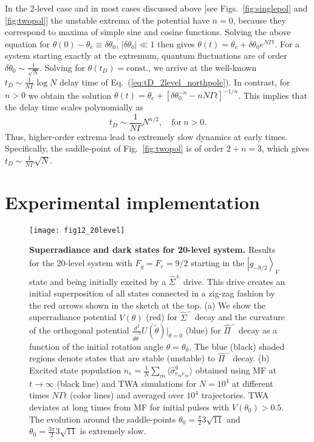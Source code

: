 \documentclass[aps,prx,superscriptaddress,twocolumn,notitlepage,nofootinbib,longbibliography]{revtex4-2}
\newcommand{\ket}[1]{\left|#1\right>}
\newcommand{\qusub}{q}
\begin{document}
In the 2-level case and in most cases discussed above [see Figs.~\ref{fig:singlepol} and \ref{fig:twopol}] the unstable extrema of the potential have $n=0$, because they correspond to maxima of simple sine and cosine functions.
Solving the above equation for $\theta(0)-\theta_e\equiv \delta\theta_0$, $|\delta\theta_0|\ll1$ then gives $\theta(t) =\theta_e+ \delta\theta_0 e^{N\Gamma t}$.
For a system starting exactly at the extremum, quantum fluctuations are of order $\delta\theta_0\sim \frac{1}{\sqrt{N}}$.
Solving for $\theta(t_D)=\text{const.}$, we arrive at the well-known $t_D\sim \frac{1}{N\Gamma} \log N$ delay time of Eq.~(\ref{eq:tD_2level_northpole}).  In contrast, for $n>0$ we obtain the solution $\theta(t) =\theta_e+ \left[ \delta\theta_0^{-n} - n N\Gamma t \right]^{-1/n}$.
This implies that the delay time scales polynomially as
\begin{equation}
	t_D \sim \frac{1}{N\Gamma} N^{n/2}, \quad \text{for}\ n>0.
\label{eq:tD_higher_order}
\end{equation}
Thus, higher-order extrema lead to extremely slow dynamics at early times. Specifically, the saddle-point of Fig.~\ref{fig:twopol} is of order $2+n=3$, which gives $t_D\sim \frac{1}{N\Gamma} \sqrt{N}$.









\section{Experimental implementation\label{sec:implementation}}

\begin{figure*}[t]
\centering
\texttt{[image: fig12\_20level]}
\caption{\textbf{Superradiance and dark states for 20-level system.} Results for the 20-level system with $F_g=F_e=9/2$ starting in the $\ket{g_{-9/2}}_V$ state and being initially excited by a $\hat{\Sigma}^\pm$ drive. This drive creates an initial superposition of all states connected in a zig-zag fashion by the red arrows shown in the sketch at the top. (a) We show the superradiance potential $V(\theta)$ (red) for $\hat{\Sigma}^-$ decay and the curvature of the orthogonal potential $\frac{d^2}{d\tilde{\theta}^2}U(\tilde\theta)\big|_{\tilde\theta=0}$ (blue) for $\hat{\Pi}^-$ decay as a function of the initial rotation angle $\theta=\theta_0$. The blue (black) shaded regions denote states that are stable (unstable) to $\hat{\Pi}^-$ decay. (b) Excited state population $n_e = \frac{1}{N} \sum_m \langle \hat{\sigma}^{\qusub}_{e_me_m}\rangle$ obtained using MF at $t\rightarrow\infty$ (black line) and TWA simulations for $N=10^4$ at different times $N\Gamma t$ (color lines) and averaged over $10^4$ trajectories. TWA deviates at long times from MF for initial pulses with $V(\theta_0)>0.5$. The evolution around the saddle-points $\theta_0=\frac{\pi}{2}3\sqrt{11}$ and $\theta_0=\frac{3\pi}{2}3\sqrt{11}$ is extremely slow. }
\label{fig:20level}
\end{figure*}
\end{document}
